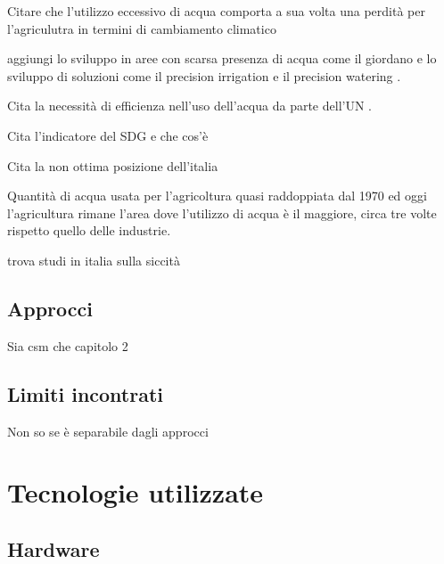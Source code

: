 \documentclass[12pt,a4paper,openright,twoside]{book}
\begin{document}
Citare che l'utilizzo eccessivo di acqua comporta a sua volta una perdità per l'agriculutra in termini di cambiamento climatico \cite{Cogato-Meggio-Migliorati-Marinello-2019}

aggiungi lo sviluppo in aree con scarsa presenza di acqua come il giordano e lo sviluppo di soluzioni come il precision irrigation e il precision watering \cite{UN-Water-Accel-Jordan-24}.

Cita la necessità di efficienza nell'uso dell'acqua da parte dell'UN \cite{UN-Water-Water-use-eff-21}.

Cita l'indicatore del SDG e che cos'è \cite{SDG-6.4.1}

Cita la non ottima posizione dell'italia \cite{SDG-6-Progress}

Quantità di acqua usata per l'agricoltura quasi raddoppiata dal 1970 ed oggi l'agricultura rimane l'area dove l'utilizzo di acqua è il maggiore, circa tre volte rispetto quello delle industrie.\cite{FAO-acquastat-2020}

trova studi in italia sulla siccità

\section{Approcci}

Sia csm che capitolo 2

\section{Limiti incontrati}

Non so se è separabile dagli approcci

\chapter{Tecnologie utilizzate}



\section{Hardware}
\end{document}
